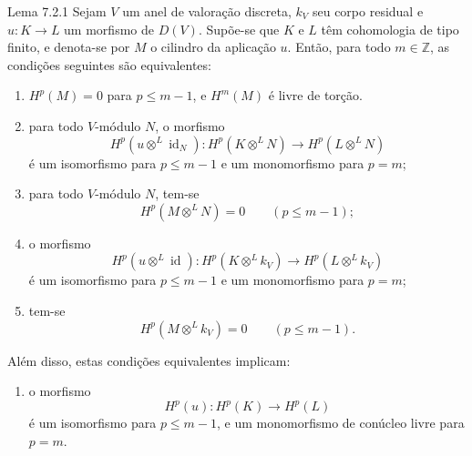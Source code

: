 \begin{statement}{Lema 7.2.1}
Sejam $V$ um anel de valoração discreta, $k_V$ seu corpo residual e $u:K\to L$ um morfismo de $D(V)$. Supõe-se que $K$ e $L$ têm cohomologia de tipo finito, e denota-se por $M$ o cilindro da aplicação $u$. Então, para todo $m\in\mathbb Z$, as condições seguintes são equivalentes:
\begin{enumerate}[label=(\roman*)]
\item $H^p(M)=0$ para $p\le m-1$, e $H^m(M)$ é livre de torção.
\item para todo $V$-módulo $N$, o morfismo
\[
H^p(u\otimes^L\operatorname{id}_N):H^p(K\otimes^L N)\to H^p(L\otimes^L N)
\]
é um isomorfismo para $p\le m-1$ e um monomorfismo para $p=m$;
\item[(ii bis)] para todo $V$-módulo $N$, tem-se
\[
H^p(M\otimes^L N)=0\qquad(p\le m-1);
\]
\item o morfismo
\[
H^p(u\otimes^L\operatorname{id}):H^p(K\otimes^L k_V)\to H^p(L\otimes^L k_V)
\]
é um isomorfismo para $p\le m-1$ e um monomorfismo para $p=m$;
\item[(iii bis)] tem-se
\[
H^p(M\otimes^L k_V)=0\qquad(p\le m-1).
\]
\end{enumerate}
Além disso, estas condições equivalentes implicam:
\begin{enumerate}[label=(\roman* bis)]
\item o morfismo
\[
H^p(u):H^p(K)\to H^p(L)
\]
é um isomorfismo para $p\le m-1$, e um monomorfismo de conúcleo livre para $p=m$.
\end{enumerate}
\end{statement}
